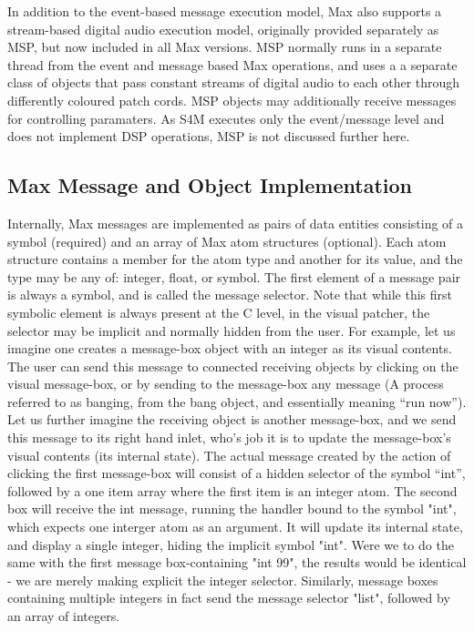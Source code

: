 \documentclass[acmsmall]{acmart}
\begin{document}
In addition to the event-based message execution model, Max also supports a stream-based digital 
audio execution model, originally provided separately as MSP, but now included in all Max versions. 
MSP normally runs in a separate thread from the event and message based Max operations, and uses a  
a separate class of objects that pass constant streams of digital audio to each other through differently 
coloured patch cords. MSP objects may additionally receive messages for controlling paramaters. As  
S4M executes only the event/message level and does not implement DSP operations, MSP is not 
discussed further here. 


\subsection{Max Message and Object Implementation} 
Internally, Max messages are implemented as pairs of data entities consisting of a symbol (required) 
and an array of Max atom structures (optional). Each atom structure contains a member for the 
atom type and another for its value, and the type may be any of: integer, float, or symbol.  
The first element of a message pair is always a symbol, and is called the message selector. 
Note that while this first symbolic element is always present at the C level, in the visual patcher, the
selector may be implicit and normally hidden from the user. 
For example, let us imagine one creates a message-box object with an integer as its visual contents.
The user can send this message to connected receiving objects by clicking on the visual message-box,
or by sending to the message-box any message (A process referred to as banging, from the bang object, 
and essentially meaning “run now”). Let us further imagine the receiving object is another message-box,
and we send this message to its right hand inlet, who's job it is to update the message-box's visual 
contents (its internal state). The actual message created by the action of clicking the first message-box
will consist of a hidden selector of the symbol “int”, followed by a one item array where the first 
item is an integer atom. The second box will receive the int message, running the handler bound to
the symbol "int", which expects one interger atom as an argument. It will update its internal state,
and display a single integer, hiding the implicit symbol "int". Were we to do the same with the first
message box-containing "int 99", the results would be identical - we are merely making explicit the
integer selector. Similarly, message boxes containing multiple integers in fact send the message
selector "list", followed by an array of integers.
\end{document}
